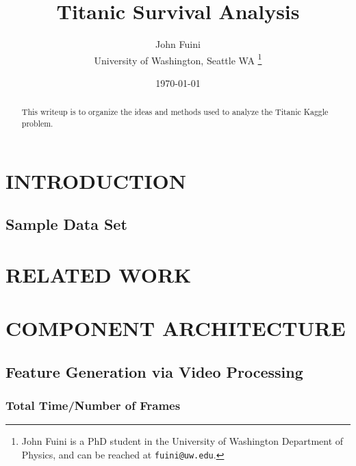 \documentclass[letterpaper, 10 pt, conference]{ieeeconf}  %
\title{\LARGE \bf
Titanic Survival Analysis\\
}
\author{John Fuini\\
	University of Washington, Seattle WA%
\thanks{John Fuini is a PhD student in the University of Washington Department of Physics, and can be reached at {\tt\small fuini@uw.edu}. }%
}
\date{ \today}
\begin{document}
\maketitle
\thispagestyle{empty}
\pagestyle{empty}

\begin{abstract}
This writeup is to organize the ideas and methods used to analyze the Titanic Kaggle problem.
\end{abstract}

\section{INTRODUCTION}


\subsection{Sample Data Set}



\section{RELATED WORK}


\section{COMPONENT ARCHITECTURE}

\subsection{Feature Generation via Video Processing}


\subsubsection{Total Time/Number of Frames}



\end{document}
